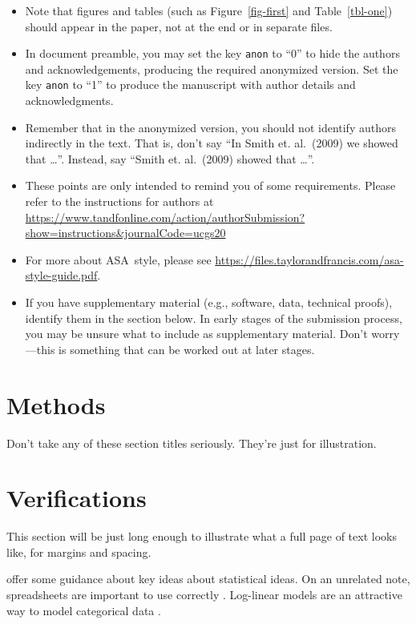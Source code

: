 \documentclass[
  12pt]{article}
\providecommand{\tightlist}{%
  \setlength{\itemsep}{0pt}\setlength{\parskip}{0pt}}\usepackage{longtable,booktabs,array}
\begin{document}
\begin{itemize}
\tightlist
\item
  Note that figures and tables (such as Figure~\ref{fig-first} and
  Table~\ref{tbl-one}) should appear in the paper, not at the end or in
  separate files.
\item
  In document preamble, you may set the key \texttt{anon} to ``0'' to hide the authors and acknowledgements,
  producing the required anonymized version. Set the key \texttt{anon} to ``1'' to produce the manuscript with author details and acknowledgments. 
\item
  Remember that in the anonymized version, you should not identify
  authors indirectly in the text. That is, don't say ``In Smith et.
  al.~(2009) we showed that \ldots{}''. Instead, say ``Smith et.
  al.~(2009) showed that \ldots{}''.
\item
  These points are only intended to remind you of some requirements.
  Please refer to the instructions for authors at
  \url{https://www.tandfonline.com/action/authorSubmission?show=instructions&journalCode=ucgs20}
\item
  For more about ASA~style, please see
  \url{https://files.taylorandfrancis.com/asa-style-guide.pdf}.
\item
  If you have supplementary material (e.g., software, data, technical
  proofs), identify them in the section below. In early stages of the
  submission process, you may be unsure what to include as supplementary
  material. Don't worry---this is something that can be worked out at
  later stages.
\end{itemize}

\section{Methods}\label{sec-meth}

Don't take any of these section titles seriously. They're just for
illustration.

\section{Verifications}\label{sec-verify}

This section will be just long enough to illustrate what a full page of
text looks like, for margins and spacing.

\addtolength{\textheight}{.5in}%

\citet{gelm:veht:2021} offer some guidance about key ideas about
statistical ideas. On an unrelated note, spreadsheets are important to
use correctly \citep{brom:woo:2018}. Log-linear models are an attractive
way to model categorical data \citep{bish:fien:1975}.
\end{document}
